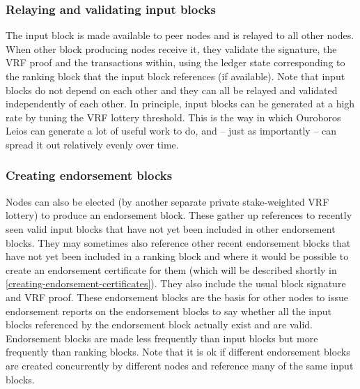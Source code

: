 \documentclass[11pt,a4paper]{article}
\begin{document}
\subsubsection{Relaying and validating input blocks}
The input block is made available to peer nodes and is relayed to all other
nodes. When other block producing nodes receive it, they validate the signature,
the VRF proof and the transactions within, using the ledger state corresponding
to the ranking block that the input block references (if available). Note that
input blocks do not depend on each other and they can all be relayed and
validated independently of each other. In principle, input blocks can be
generated at a high rate by tuning the VRF lottery threshold. This is the way
in which Ouroboros Leios can generate a lot of useful work to do, and -- just
as importantly -- can spread it out relatively evenly over time.

\subsubsection{Creating endorsement blocks}
Nodes can also be elected (by another separate private stake-weighted VRF
lottery) to produce an endorsement block. These gather up references to
recently seen valid input blocks that have not yet been included in other
endorsement blocks. They may sometimes also reference other recent endorsement
blocks that have not yet been included in a ranking block and where it would be
possible to create an endorsement certificate for them (which will be described
shortly in \cref{creating-endorsement-certificates}). They also include the
usual block signature and VRF proof. These endorsement blocks are the basis for
other nodes to issue endorsement reports on the endorsement blocks to say
whether all the input blocks referenced by the endorsement block actually exist
and are valid. Endorsement blocks are made less frequently than input blocks
but more frequently than ranking blocks. Note that it is ok if different
endorsement blocks are created concurrently by different nodes and reference
many of the same input blocks.
\end{document}

